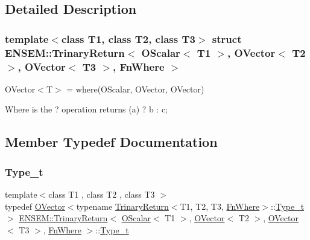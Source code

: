 \subsection{Detailed Description}
\subsubsection*{template$<$class T1, class T2, class T3$>$\newline
struct E\+N\+S\+E\+M\+::\+Trinary\+Return$<$ O\+Scalar$<$ T1 $>$, O\+Vector$<$ T2 $>$, O\+Vector$<$ T3 $>$, Fn\+Where $>$}

O\+Vector$<$\+T$>$ = where(\+O\+Scalar, O\+Vector, O\+Vector) 

Where is the ? operation returns (a) ? b \+: c; 

\subsection{Member Typedef Documentation}
\mbox{\label{structENSEM_1_1TrinaryReturn_3_01OScalar_3_01T1_01_4_00_01OVector_3_01T2_01_4_00_01OVector_3_01T3_01_4_00_01FnWhere_01_4_a27ce5df6798f4d75da92a7119c7f5987}} 
\subsubsection{\texorpdfstring{Type\_t}{Type\_t}\hspace{0.1cm}{\footnotesize\ttfamily [1/2]}}
{\footnotesize\ttfamily template$<$class T1 , class T2 , class T3 $>$ \\
typedef \mbox{\hyperlink{classENSEM_1_1OVector}{O\+Vector}}$<$typename \mbox{\hyperlink{structENSEM_1_1TrinaryReturn}{Trinary\+Return}}$<$T1, T2, T3, \mbox{\hyperlink{structENSEM_1_1FnWhere}{Fn\+Where}}$>$\+::\mbox{\hyperlink{structENSEM_1_1TrinaryReturn_3_01OScalar_3_01T1_01_4_00_01OVector_3_01T2_01_4_00_01OVector_3_01T3_01_4_00_01FnWhere_01_4_a27ce5df6798f4d75da92a7119c7f5987}{Type\+\_\+t}}$>$ \mbox{\hyperlink{structENSEM_1_1TrinaryReturn}{E\+N\+S\+E\+M\+::\+Trinary\+Return}}$<$ \mbox{\hyperlink{classENSEM_1_1OScalar}{O\+Scalar}}$<$ T1 $>$, \mbox{\hyperlink{classENSEM_1_1OVector}{O\+Vector}}$<$ T2 $>$, \mbox{\hyperlink{classENSEM_1_1OVector}{O\+Vector}}$<$ T3 $>$, \mbox{\hyperlink{structENSEM_1_1FnWhere}{Fn\+Where}} $>$\+::\mbox{\hyperlink{structENSEM_1_1TrinaryReturn_3_01OScalar_3_01T1_01_4_00_01OVector_3_01T2_01_4_00_01OVector_3_01T3_01_4_00_01FnWhere_01_4_a27ce5df6798f4d75da92a7119c7f5987}{Type\+\_\+t}}}

